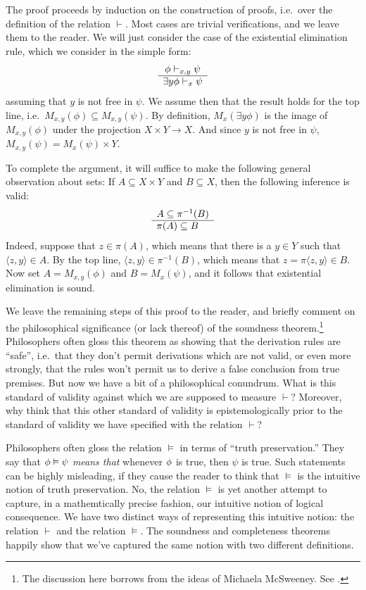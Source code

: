 The proof proceeds by induction on the construction of proofs, i.e.\
over the definition of the relation $\vdash$.  Most cases are trivial
verifications, and we leave them to the reader.  We will just consider
the case of the existential elimination rule, which we consider in the
simple form:
\[ \begin{array}{c c c} \phi\vdash _{x,y}\psi \\ \hline \exists
    y\phi\vdash _x \psi \end{array} \] assuming that $y$ is not free
in $\psi$.  We assume then that the result holds for the top line,
i.e.\ $M_{x,y}(\phi )\subseteq M_{x,y}(\psi )$.  By definition,
$M_x(\exists y\phi )$ is the image of $M_{x,y}(\phi )$ under the
projection $X\times Y\to X$.  And since $y$ is not free in $\psi$,
$M_{x,y}(\psi )=M_x(\psi )\times Y$.

To complete the argument, it will suffice to make the following
general observation about sets: If $A\subseteq X\times Y$ and
$B\subseteq X$, then the following inference is valid:
\[ \begin{array}{l l l}
     A\subseteq \pi ^{-1}(B) \\ \hline
     \pi (A)\subseteq B 
   \end{array} \]
 Indeed, suppose that $z\in \pi (A)$, which means that there is a $y\in
 Y$ such that $\langle z,y\rangle \in A$.  By the top line, $\langle
 z,y\rangle\in\pi ^{-1}(B)$, which means that $z=\pi \langle
 z,y\rangle \in B$.  Now set $A=M_{x,y}(\phi )$ and $B=M_x(\psi )$,
 and it follows that existential elimination is sound.

 We leave the remaining steps of this proof to the reader, and briefly
 comment on the philosophical significance (or lack thereof) of the
 soundness theorem.\footnote{The discussion here borrows from the
   ideas of Michaela McSweeney.  See \cite{mmm}.}  Philosophers often
 gloss this theorem as showing that the derivation rules are ``safe'',
 i.e.\ that they don't permit derivations which are not valid, or even
 more strongly, that the rules won't permit us to derive a false
 conclusion from true premises.  But now we have a bit of a
 philosophical conundrum.  What is this standard of validity against
 which we are supposed to measure $\vdash$?  Moreover, why think that
 this other standard of validity is epistemologically prior to the
 standard of validity we have specified with the relation $\vdash$?

 Philosophers often gloss the relation $\vDash$ in terms of ``truth
 preservation.''  They say that $\phi\vDash\psi$ \textit{means that}
 whenever $\phi$ is true, then $\psi$ is true.  Such statements can be
 highly misleading, if they cause the reader to think that $\vDash$ is
 the intuitive notion of truth preservation.  No, the relation
 $\vDash$ is yet another attempt to capture, in a mathemtically
 precise fashion, our intuitive notion of logical consequence.  We
 have two distinct ways of representing this intuitive notion: the
 relation $\vdash$ and the relation $\vDash$.  The soundness and
 completeness theorems happily show that we've captured the same
 notion with two different definitions.

